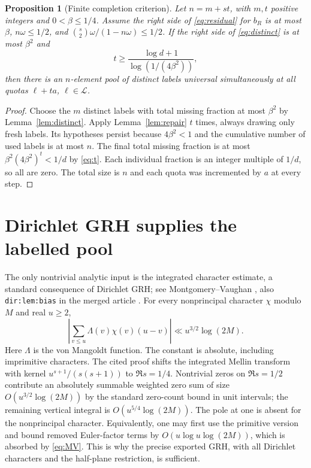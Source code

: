 \documentclass[11pt]{article}
\newtheorem{proposition}[theorem]{Proposition}
\theoremstyle{definition}\newtheorem{remark}[theorem]{Remark}
\begin{document}
\begin{proposition}[Finite completion criterion]\label{prop:completion}
Let $n=m+st$, with $m,t$ positive integers and $0<\beta\le1/4$. Assume the right side of \eqref{eq:residual} for $b_R$ is at most $\beta$, $n\omega\le1/2$, and $\binom{s}{2}\omega/(1-n\omega)\le1/2$. If the right side of \eqref{eq:distinct} is at most $\beta^2$ and
\begin{equation}\label{eq:t}
 t\ge\frac{\log d+1}{\log(1/(4\beta^2))},
\end{equation}
then there is an $n$-element pool of distinct labels universal simultaneously at all quotas $\ell+t a$, $\ell\in\mathcal L$.
\end{proposition}
\begin{proof}
Choose the $m$ distinct labels with total missing fraction at most $\beta^2$ by Lemma~\ref{lem:distinct}. Apply Lemma~\ref{lem:repair} $t$ times, always drawing only fresh labels. Its hypotheses persist because $4\beta^2<1$ and the cumulative number of used labels is at most $n$. The final total missing fraction is at most $\beta^2(4\beta^2)^t<1/d$ by \eqref{eq:t}. Each individual fraction is an integer multiple of $1/d$, so all are zero. The total size is $n$ and each quota was incremented by $a$ at every step.
\end{proof}

\section{Dirichlet GRH supplies the labelled pool}\label{sec:prime}
The only nontrivial analytic input is the integrated character estimate, a standard consequence of Dirichlet GRH; see Montgomery--Vaughan \cite[Eq.~(13.28), Thm.~13.11]{MV}, also \texttt{dir:lem:bias} in the merged article \cite{Article}. For every nonprincipal character $\chi$ modulo $M$ and real $u\ge2$,
\begin{equation}\label{eq:MV}
 \left|\sum_{v\le u}\Lambda(v)\chi(v)(u-v)\right|\ll u^{3/2}\log(2M).
\end{equation}
Here $\Lambda$ is the von Mangoldt function. The constant is absolute, including imprimitive characters. The cited proof shifts the integrated Mellin transform with kernel $u^{s+1}/(s(s+1))$ to $\Re s=1/4$. Nontrivial zeros on $\Re s=1/2$ contribute an absolutely summable weighted zero sum of size $O(u^{3/2}\log(2M))$ by the standard zero-count bound in unit intervals; the remaining vertical integral is $O(u^{5/4}\log(2M))$. The pole at one is absent for the nonprincipal character. Equivalently, one may first use the primitive version and bound removed Euler-factor terms by $O(u\log u\log(2M))$, which is absorbed by \eqref{eq:MV}. This is why the precise exported GRH, with all Dirichlet characters and the half-plane restriction, is sufficient.
\end{document}
